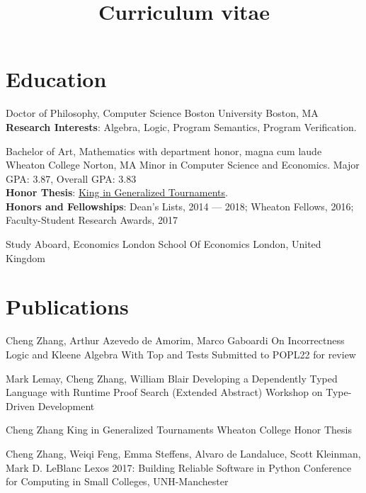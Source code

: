 \documentclass[11pt,roman]{moderncv}        %
\title{Curriculum vitae}
\begin{document}

\makecvtitle{}

\setlength{\parskip}{2.5px}
\linespread{1.3}
\selectfont


\section{Education}

{Doctor of Philosophy, Computer Science} {}
{Boston University}
{Boston, MA}
{\textbf{Research Interests}:
Algebra, Logic, Program Semantics, Program Verification. }  %

{Bachelor of Art, Mathematics} {with department honor, magna cum laude}
{Wheaton College}
{Norton, MA}
{Minor in Computer Science and Economics.
Major GPA\@: 3.87, Overall GPA\@: 3.83\\
\textbf{Honor Thesis}: 
  \href{http://hdl.handle.net/11040/24570}{King in Generalized Tournaments}.\\
\textbf{Honors and Fellowships}: Dean's Lists, 2014 --- 2018;
Wheaton Fellows, 2016;
Faculty-Student Research Awards, 2017
}

{Study Aboard, Economics} {}
{London School Of Economics}
{London, United Kingdom}
{}  %



\section{Publications}

{Cheng Zhang, Arthur Azevedo de Amorim, Marco Gaboardi}
{On Incorrectness Logic and Kleene Algebra With Top and Tests}
{Submitted to POPL22 for review}
{}{}

{Mark Lemay, Cheng Zhang, William Blair}
{Developing a Dependently Typed Language with Runtime Proof Search (Extended Abstract)}
{Workshop on Type-Driven Development}
{}{}

{Cheng Zhang}
{King in Generalized Tournaments}
{Wheaton College Honor Thesis}
{}{}

{Cheng Zhang, Weiqi Feng, Emma Steffens, Alvaro de Landaluce, Scott Kleinman, Mark D. LeBlanc}
{Lexos 2017: Building Reliable Software in Python}
{Conference for Computing in Small Colleges, UNH-Manchester}
{}{}
\end{document}
